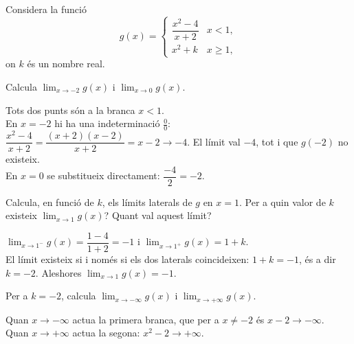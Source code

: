 Considera la funció
\[
g(x)=\begin{cases}
  \dfrac{x^2-4}{x+2} & \si{x<1},\\[8pt]
  x^2+k & \si{x\ge 1},
\end{cases}
\]
on $k$ és un nombre real.

\begin{apartats}

Calcula $\lim_{x\to-2}g(x)$ i $\lim_{x\to0}g(x)$.

\begin{solucio}
Tots dos punts són a la branca $x<1$.\\
En $x=-2$ hi ha una indeterminació $\tfrac00$:
$\dfrac{x^2-4}{x+2}=\dfrac{(x+2)(x-2)}{x+2}=x-2\to-4$.
El límit val $-4$, tot i que $g(-2)$ no existeix.\\
En $x=0$ se substitueix directament: $\dfrac{-4}{2}=-2$.
\end{solucio}

Calcula, en funció de $k$, els límits laterals de $g$ en $x=1$. Per a quin valor de $k$
existeix $\lim_{x\to1}g(x)$? Quant val aquest límit?

\begin{solucio}
$\lim_{x\to1^-}g(x)=\dfrac{1-4}{1+2}=-1$ \quad i \quad $\lim_{x\to1^+}g(x)=1+k$.\\
El límit existeix si i només si els dos laterals coincideixen: $1+k=-1$, és a dir
$\boxed{k=-2}$. Aleshores $\lim_{x\to1}g(x)=-1$.
\end{solucio}

Per a $k=-2$, calcula $\lim_{x\to-\infty}g(x)$ i $\lim_{x\to+\infty}g(x)$.

\begin{solucio}
Quan $x\to-\infty$ actua la primera branca, que per a $x\ne-2$ és $x-2\to-\infty$.\\
Quan $x\to+\infty$ actua la segona: $x^2-2\to+\infty$.
\end{solucio}

\end{apartats}
